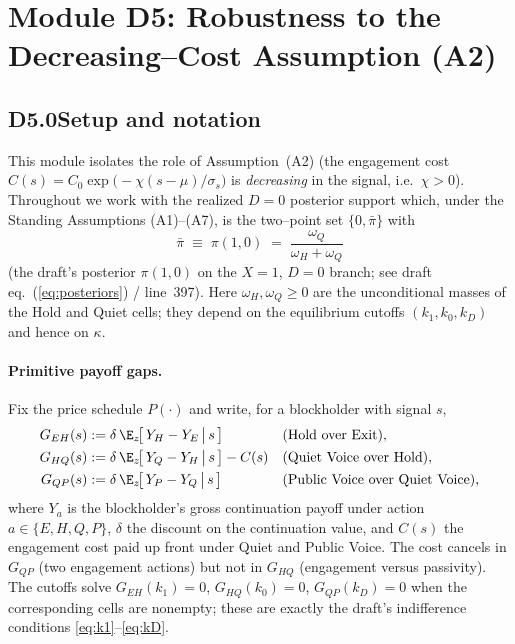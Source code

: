 \section*{Module D5: Robustness to the Decreasing--Cost Assumption (A2)}

\subsection*{D5.0\quad Setup and notation}

This module isolates the role of Assumption~\textup{(A2)} (the engagement cost
$C(s)=C_0\exp\!\big(-\chi (s-\mu)/\sigma_s\big)$ is \emph{decreasing} in the
signal, i.e.\ $\chi>0$). Throughout we work with the realized $D=0$ posterior
support which, under the Standing Assumptions \textup{(A1)}--\textup{(A7)}, is
the two--point set $\{0,\bar\pi\}$ with
\[
  \bar\pi \;\equiv\; \pi(1,0)\;=\;\frac{\omega_Q}{\omega_H+\omega_Q}
\]
(the draft's posterior $\pi(1,0)$ on the $X=1$, $D=0$ branch; see draft
eq.~(\ref{eq:posteriors}) / line~397). Here $\omega_H,\omega_Q\ge 0$ are the
unconditional masses of the Hold and Quiet cells; they depend on the
equilibrium cutoffs $(k_1,k_0,k_D)$ and hence on $\kappa$.

\paragraph{Primitive payoff gaps.}
Fix the price schedule $P(\cdot)$ and write, for a blockholder with signal $s$,
\begin{align}
  G_{EH}(s) &:= \delta\,\E_z\!\big[\,Y_H - Y_E \,\big|\, s\,\big]
     &&\text{(Hold over Exit)},\\
  G_{HQ}(s) &:= \delta\,\E_z\!\big[\,Y_Q - Y_H \,\big|\, s\,\big] - C(s)
     &&\text{(Quiet Voice over Hold)},\\
  G_{QP}(s) &:= \delta\,\E_z\!\big[\,Y_P - Y_Q \,\big|\, s\,\big]
     &&\text{(Public Voice over Quiet Voice)},
\end{align}
where $Y_a$ is the blockholder's gross continuation payoff under action
$a\in\{E,H,Q,P\}$, $\delta$ the discount on the continuation value, and $C(s)$
the engagement cost paid up front under Quiet and Public Voice. The cost
cancels in $G_{QP}$ (two engagement actions) but not in $G_{HQ}$ (engagement
versus passivity). The cutoffs solve $G_{EH}(k_1)=0$, $G_{HQ}(k_0)=0$,
$G_{QP}(k_D)=0$ when the corresponding cells are nonempty; these are exactly the
draft's indifference conditions \eqref{eq:k1}--\eqref{eq:kD}.

